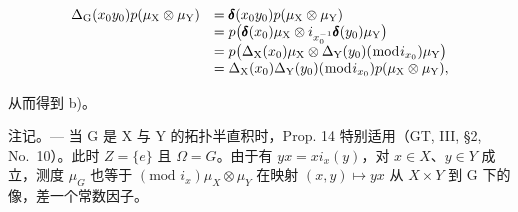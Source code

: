 \[
\begin{array}{r l} \Delta_ {\mathrm{G}} (x _ {0} y _ {0}) p (\mu_ {\mathrm{X}} \otimes \mu_ {\mathrm{Y}}) & = \pmb {\delta} (x _ {0} y _ {0}) p (\mu_ {\mathrm{X}} \otimes \mu_ {\mathrm{Y}}) \\ & = p \big (\pmb {\delta} (x _ {0}) \mu_ {\mathrm{X}} \otimes i _ {x _ {0} ^ {- 1}} \pmb {\delta} (y _ {0}) \mu_ {\mathrm{Y}} \big) \\ & = p \big (\Delta_ {\mathrm{X}} (x _ {0}) \mu_ {\mathrm{X}} \otimes \Delta_ {\mathrm{Y}} (y _ {0}) (\bmod i _ {x _ {0}}) \mu_ {\mathrm{Y}} \big) \\ & = \Delta_ {\mathrm{X}} (x _ {0}) \Delta_ {\mathrm{Y}} (y _ {0}) (\bmod i _ {x _ {0}}) p (\mu_ {\mathrm{X}} \otimes \mu_ {\mathrm{Y}}), \end{array}
\]

从而得到 b)。

注记。--- 当 G 是 X 与 Y 的拓扑半直积时，Prop. 14 特别适用（GT, III, §2, No.~10）。此时 \(Z = \{e\}\) 且 \(\Omega = G\)。由于有 \(yx = x i_{x}(y)\)，对 \(x \in X\)、\(y \in Y\) 成立，测度 \(\mu_{G}\) 也等于 \((\text{mod } i_{x})\mu_{X} \otimes \mu_{Y}\) 在映射 \((x, y) \mapsto yx\) 从 \(X \times Y\) 到 G 下的像，差一个常数因子。

